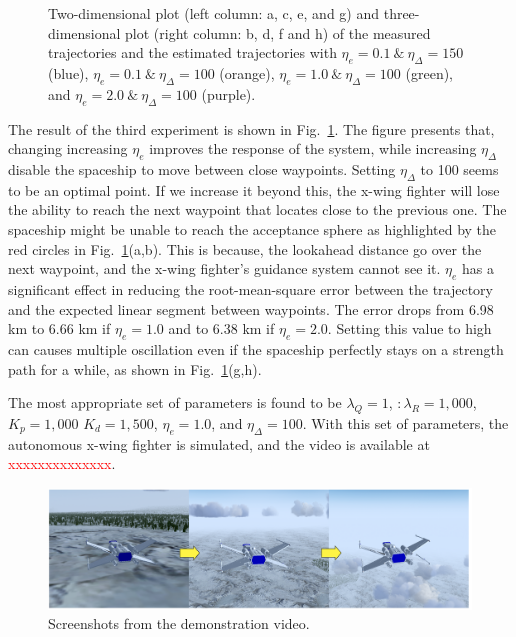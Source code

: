\begin{figure}[]
	\caption{Two-dimensional plot (left column: a, c, e, and g) and three-dimensional plot (right column: b, d, f and h) of the measured trajectories and the estimated trajectories with $\eta_e=0.1\:\&\:\eta_\Delta=150$ (blue), $\eta_e=0.1\:\&\:\eta_\Delta=100$ (orange), $\eta_e=1.0\:\&\:\eta_\Delta=100$ (green), and $\eta_e=2.0\:\&\:\eta_\Delta=100$ (purple).}
	\label{fig:exp_lookahead}
\end{figure}

 The result of the third experiment is shown in Fig.~\ref{fig:exp_lookahead}. The figure presents that, changing increasing $\eta_e$ improves the response of the system, while increasing $\eta_\Delta$ disable the spaceship to move between close waypoints. Setting $\eta_\Delta$ to 100 seems to be an optimal point. If we increase it beyond this, the x-wing fighter will lose the ability to reach the next waypoint that locates close to the previous one. The spaceship might be unable to reach the acceptance sphere as highlighted by the red circles in Fig.~\ref{fig:exp_lookahead}(a,b). This is because, the lookahead distance go over the next waypoint, and the x-wing fighter's guidance system cannot see it. $\eta_e$ has a significant effect in reducing the root-mean-square error between the trajectory and the expected linear segment between waypoints. The error drops from 6.98 km to 6.66 km if $\eta_e=1.0$ and to 6.38 km if $\eta_e=2.0$. Setting this value to high can causes multiple oscillation even if the spaceship perfectly stays on a strength path for a while, as shown in Fig.~\ref{fig:exp_lookahead}(g,h). 
 
 The most appropriate set of parameters is found to be $\lambda_Q=1$, $:\lambda_R=1,000$, $K_p=1,000$ $K_d=1,500$, $\eta_e=1.0$, and $\eta_\Delta=100$. With this set of parameters, the autonomous x-wing fighter is simulated, and the video is available at \textcolor{red}{xxxxxxxxxxxxxx}.

\begin{figure}[!h]
	\centering
	\includegraphics[width=1.0\linewidth]{figures/screenshots}
	\caption{Screenshots from the demonstration video.}
	\label{fig:screenshot}
\end{figure}

